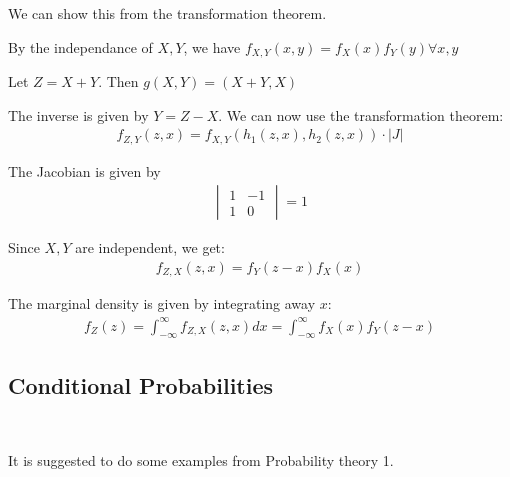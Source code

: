 \par\bigskip
\noindent We can show this from the transformation theorem.
\par\bigskip
\noindent By the independance of $X,Y$, we have $f_{X,Y}(x,y) = f_X(x)f_Y(y) \forall x,y$\par
Let $Z = X+Y$. Then $g(X,Y) = (X+Y,X)$\par
The inverse is given by $Y = Z-X$. We can now use the transformation theorem:
\begin{equation*}
  \begin{gathered}
    f_{Z,Y}(z,x) = f_{X,Y}(h_1(z,x), h_2(z,x))\cdot\left|J\right|
  \end{gathered}
\end{equation*}
\par\bigskip
\noindent The Jacobian is given by
\begin{equation*}
  \begin{gathered}
    \begin{vmatrix}1&-1\\1&0\end{vmatrix} = 1
  \end{gathered}
\end{equation*}\par
\noindent Since $X,Y$ are independent, we get:
\begin{equation*}
  \begin{gathered}
    f_{Z,X}(z,x) = f_Y(z-x)f_X(x)
  \end{gathered}
\end{equation*}\par
\noindent The marginal density is given by integrating away $x$:
\begin{equation*}
  \begin{gathered}
    f_Z(z) = \int_{-\infty}^{\infty}f_{Z,X}(z,x)dx = \int_{-\infty}^{\infty}f_X(x)f_Y(z-x)
  \end{gathered}
\end{equation*}
\par\bigskip
\subsection{Conditional Probabilities}\hfill\\
\par\bigskip
\noindent It is suggested to do some examples from Probability theory 1. 
